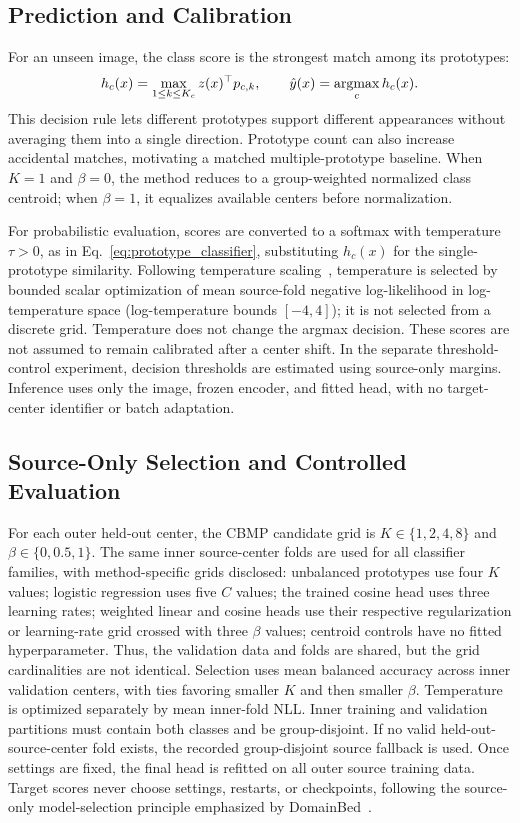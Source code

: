 \subsection{Prediction and Calibration}
For an unseen image, the class score is the strongest match among its prototypes:
\begin{equation}
    h_c(x)=\max_{1\leq k\leq K_c}z(x)^\top p_{c,k},
    \qquad \hat y(x)=\mathop{\rm argmax}_{c} h_c(x).
    \label{eq:cbmp_prediction}
\end{equation}
This decision rule lets different prototypes support different appearances without averaging them into a single direction. Prototype count can also increase accidental matches, motivating a matched multiple-prototype baseline. When $K=1$ and $\beta=0$, the method reduces to a group-weighted normalized class centroid; when $\beta=1$, it equalizes available centers before normalization.

For probabilistic evaluation, scores are converted to a softmax with temperature $\tau>0$, as in Eq.~\ref{eq:prototype_classifier}, substituting $h_c(x)$ for the single-prototype similarity. Following temperature scaling~\cite{guo2017calibration}, temperature is selected by bounded scalar optimization of mean source-fold negative log-likelihood in log-temperature space (log-temperature bounds $[-4,4]$); it is not selected from a discrete grid. Temperature does not change the argmax decision. These scores are not assumed to remain calibrated after a center shift. In the separate threshold-control experiment, decision thresholds are estimated using source-only margins. Inference uses only the image, frozen encoder, and fitted head, with no target-center identifier or batch adaptation.

\subsection{Source-Only Selection and Controlled Evaluation}
For each outer held-out center, the CBMP candidate grid is $K\in\{1,2,4,8\}$ and $\beta\in\{0,0.5,1\}$. The same inner source-center folds are used for all classifier families, with method-specific grids disclosed: unbalanced prototypes use four $K$ values; logistic regression uses five $C$ values; the trained cosine head uses three learning rates; weighted linear and cosine heads use their respective regularization or learning-rate grid crossed with three $\beta$ values; centroid controls have no fitted hyperparameter. Thus, the validation data and folds are shared, but the grid cardinalities are not identical. Selection uses mean balanced accuracy across inner validation centers, with ties favoring smaller $K$ and then smaller $\beta$. Temperature is optimized separately by mean inner-fold NLL. Inner training and validation partitions must contain both classes and be group-disjoint. If no valid held-out-source-center fold exists, the recorded group-disjoint source fallback is used. Once settings are fixed, the final head is refitted on all outer source training data. Target scores never choose settings, restarts, or checkpoints, following the source-only model-selection principle emphasized by DomainBed~\cite{gulrajani2021domainbed}.


